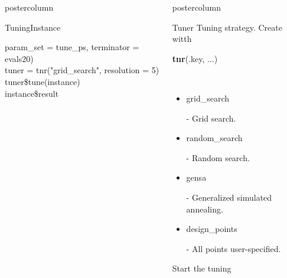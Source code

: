 \documentclass{beamer}
\newlength{\columnheight} %
\newcommand{\codeinline}[1]{\begin{codeboxinline}#1\end{codeboxinline}}
\begin{document}
\begin{frame}[fragile]{}
\begin{columns}
\begin{column}{.245\textwidth}
\begin{beamercolorbox}[center]{postercolumn}
\begin{minipage}{.98\textwidth}
{\begin{myblock}{TuningInstance}
\begin{codeboxexample}
{							\hspace*{1ex} param\_set = tune\_ps, terminator = evals20)\\
							tuner = tnr("grid\_search", resolution = 5)
							\vspace{1em}
							\\
							tuner\$tune(instance)\\
							instance\$result
						    }
						\end{codeboxexample}
						\end{myblock}
						\vfill}
				\end{minipage}
			\end{beamercolorbox}
		\end{column}
		\begin{column}{.245\textwidth}
			\begin{beamercolorbox}[center]{postercolumn}
				\begin{minipage}{.98\textwidth}
					\parbox[t][\columnheight]{\textwidth}{
						\begin{myblock}{Tuner}
                            Tuning strategy. Create witth \codeinline{\textbf{tnr}(.key, ...)}
							\\
							\begin{itemize}
								\item \codeinline{grid\_search} - Grid search.
								\item \codeinline{random\_search} - Random search.
								\item \codeinline{gensa} - Generalized simulated annealing.
								\item \codeinline{design\_points} - All points user-specified.
							\end{itemize}
							\vspace{0.5cm}
						\end{myblock}
						\begin{myblock}{Start the tuning}

\end{myblock}}
\end{minipage}
\end{beamercolorbox}
\end{column}
\end{columns}
\end{frame}
\end{document}

